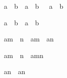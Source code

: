\begin{isabellebody}
\begin{isamarkuptext}
\begin{isabelle}%
{\isacharparenleft}{\isasymbar}a{\isasymbar}\ {\isasymle}\ b{\isacharparenright}\ {\isacharequal}\ {\isacharparenleft}a\ {\isasymle}\ b\ {\isasymand}\ {\isacharminus}\ a\ {\isasymle}\ b{\isacharparenright}%
\end{isabelle}

\begin{isabelle}%
{\isasymbar}a\ {\isacharplus}\ b{\isasymbar}\ {\isasymle}\ {\isasymbar}a{\isasymbar}\ {\isacharplus}\ {\isasymbar}b{\isasymbar}%
\end{isabelle}

\begin{isabelle}%
a\isactrlbsup m\ {\isacharplus}\ n\isactrlesup \ {\isacharequal}\ a\isactrlbsup m\isactrlesup \ {\isacharasterisk}\ a\isactrlbsup n\isactrlesup %
\end{isabelle}

\begin{isabelle}%
a\isactrlbsup m\ {\isacharasterisk}\ n\isactrlesup \ {\isacharequal}\ a\isactrlbsup m\isactrlesup \isactrlbsup n\isactrlesup %
\end{isabelle}

\begin{isabelle}%
{\isasymbar}a\isactrlbsup n\isactrlesup {\isasymbar}\ {\isacharequal}\ {\isasymbar}a{\isasymbar}\isactrlbsup n\isactrlesup %
\end{isabelle}
%
\end{isamarkuptext}%
\isamarkuptrue%
%
\isadelimtheory
%
\endisadelimtheory
%
\isatagtheory
{}\isamarkupfalse%
%
\endisatagtheory
{\isafoldtheory}%
%
\isadelimtheory
%
\endisadelimtheory
\isanewline
\end{isabellebody}%

